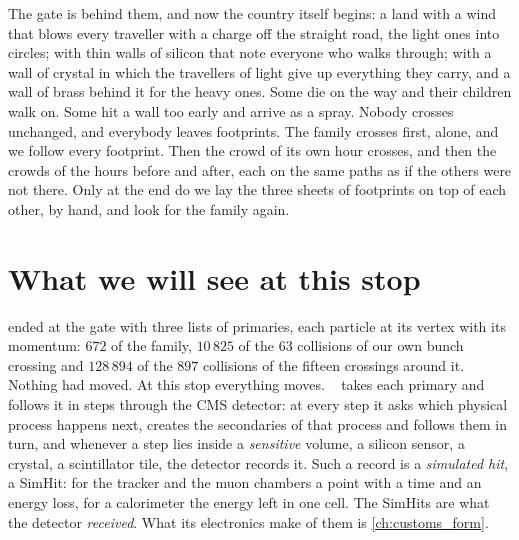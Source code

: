 \begin{journeybox}
The gate is behind them, and now the country itself begins: a land with a
wind that blows every traveller with a charge off the straight road, the
light ones into circles; with thin walls of silicon that note everyone who
walks through; with a wall of crystal in which the travellers of light give
up everything they carry, and a wall of brass behind it for the heavy ones.
Some die on the way and their children walk on. Some hit a wall too early
and arrive as a spray. Nobody crosses unchanged, and everybody leaves
footprints. The family crosses first, alone, and we follow every footprint.
Then the crowd of its own hour crosses, and then the crowds of the hours
before and after, each on the same paths as if the others were not there.
Only at the end do we lay the three sheets of footprints on top of each
other, by hand, and look for the family again.
\end{journeybox}


\section{What we will see at this stop}
\label{sec:crowd_at_the_border:what_we_compute}

 ended at the gate with three lists of
\GEANT primaries, each particle at its vertex with its momentum: $672$ of
the family, $10\,825$ of the $63$ collisions of our own bunch crossing and
$128\,894$ of the $897$ collisions of the fifteen crossings around it.
Nothing had moved. At this stop everything moves. \GEANT~\cite{GEANT4:2002zbu,Allison:2016lfl}
takes each primary and follows it in steps through the CMS detector: at
every step it asks which physical process happens next, creates the
secondaries of that process and follows them in turn, and whenever a step
lies inside a \emph{sensitive} volume, a silicon sensor, a crystal, a
scintillator tile, the detector records it. Such a record is a
\emph{simulated hit}, a SimHit: for the tracker and the muon chambers a
point with a time and an energy loss, for a calorimeter the energy left in
one cell. The SimHits are what the detector \emph{received}. What its
electronics make of them is \cref{ch:customs_form}.


